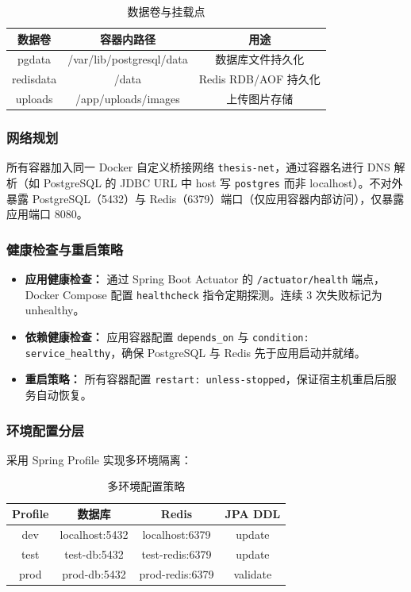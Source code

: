 \documentclass{../../softeng}
\begin{document}
\begin{table}[htbp]
\centering
\caption{数据卷与挂载点}
\label{tab:volumes}
\begin{tabular}{|c|c|c|}
\hline
\textbf{数据卷} & \textbf{容器内路径} & \textbf{用途} \\
\hline
pgdata & /var/lib/postgresql/data & 数据库文件持久化 \\
\hline
redisdata & /data & Redis RDB/AOF 持久化 \\
\hline
uploads & /app/uploads/images & 上传图片存储 \\
\hline
\end{tabular}
\end{table}

\subsubsection{网络规划}

所有容器加入同一 Docker 自定义桥接网络 \texttt{thesis-net}，通过容器名进行 DNS 解析（如 PostgreSQL 的 JDBC URL 中 host 写 \texttt{postgres} 而非 localhost）。不对外暴露 PostgreSQL（5432）与 Redis（6379）端口（仅应用容器内部访问），仅暴露应用端口 8080。

\subsubsection{健康检查与重启策略}

\begin{itemize}
    \item \textbf{应用健康检查：} 通过 Spring Boot Actuator 的 \texttt{/actuator/health} 端点，Docker Compose 配置 \texttt{healthcheck} 指令定期探测。连续 3 次失败标记为 unhealthy。
    \item \textbf{依赖健康检查：} 应用容器配置 \texttt{depends\_on} 与 \texttt{condition: service\_healthy}，确保 PostgreSQL 与 Redis 先于应用启动并就绪。
    \item \textbf{重启策略：} 所有容器配置 \texttt{restart: unless-stopped}，保证宿主机重启后服务自动恢复。
\end{itemize}

\subsubsection{环境配置分层}

采用 Spring Profile 实现多环境隔离：

\begin{table}[htbp]
\centering
\caption{多环境配置策略}
\label{tab:env-config}
\begin{tabular}{|c|c|c|c|}
\hline
\textbf{Profile} & \textbf{数据库} & \textbf{Redis} & \textbf{JPA DDL} \\
\hline
dev & localhost:5432 & localhost:6379 & update \\
\hline
test & test-db:5432 & test-redis:6379 & update \\
\hline
prod & prod-db:5432 & prod-redis:6379 & validate \\
\hline
\end{tabular}
\end{table}
\end{document}
